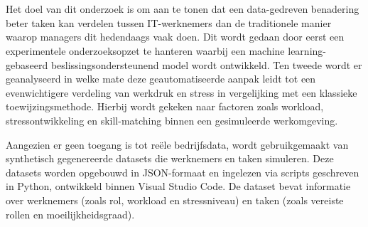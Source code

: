 

\chapter{}%
\label{ch:methodologie}

\vspace{1em}Het doel van dit onderzoek is om aan te tonen dat een data-gedreven benadering beter taken kan verdelen tussen IT-werknemers dan de traditionele manier waarop managers dit hedendaags vaak doen. Dit wordt gedaan door eerst een experimentele onderzoeksopzet te hanteren waarbij een machine learning-gebaseerd beslissingsondersteunend model wordt ontwikkeld. Ten tweede wordt er geanalyseerd in welke mate deze geautomatiseerde aanpak leidt tot een evenwichtigere verdeling van werkdruk en stress in vergelijking met een klassieke toewijzingsmethode. Hierbij wordt gekeken naar factoren zoals workload, stressontwikkeling en skill-matching binnen een gesimuleerde werkomgeving.

Aangezien er geen toegang is tot reële bedrijfsdata, wordt gebruikgemaakt van synthetisch gegenereerde datasets die werknemers en taken simuleren. Deze datasets worden opgebouwd in JSON-formaat en ingelezen via scripts geschreven in Python, ontwikkeld binnen Visual Studio Code. De dataset bevat informatie over werknemers (zoals rol, workload en stressniveau) en taken (zoals vereiste rollen en moeilijkheidsgraad).

